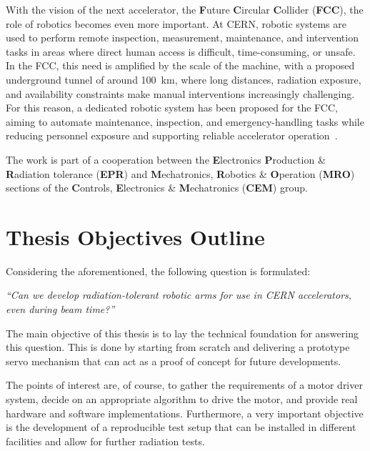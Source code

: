With the vision of the next accelerator, the \textbf{F}uture \textbf{C}ircular \textbf{C}ollider (\textbf{FCC}), the role of robotics becomes even more important. At CERN, robotic systems are used to perform remote inspection, measurement, maintenance, and intervention tasks in areas where direct human access is difficult, time-consuming, or unsafe. In the FCC, this need is amplified by the scale of the machine, with a proposed underground tunnel of around \SI{100}{\kilo\metre}, where long distances, radiation exposure, and availability constraints make manual interventions increasingly challenging. For this reason, a dedicated robotic system has been proposed for the FCC, aiming to automate maintenance, inspection, and emergency-handling tasks while reducing personnel exposure and supporting reliable accelerator operation~\cite{Gamper2024Robotic}.

The work is part of a cooperation between the \textbf{E}lectronics \textbf{P}roduction \& \textbf{R}adiation tolerance (\textbf{EPR}) and \textbf{M}echatronics, \textbf{R}obotics \& \textbf{O}peration (\textbf{MRO}) sections of the \textbf{C}ontrols, \textbf{E}lectronics \& \textbf{M}echatronics (\textbf{CEM}) group.

\section{Thesis Objectives Outline}
\label{section:thesis-objectives}

Considering the aforementioned, the following question is formulated:

\vspace{1em}

\begin{center}
    \begin{minipage}{0.65\textwidth}
        \centering
        \itshape
        \normalsize
        ``Can we develop radiation-tolerant robotic arms for use in CERN accelerators, even during beam time?''
    \end{minipage}
\end{center}

\vspace{1em}

The main objective of this thesis is to lay the technical foundation for answering this question. This is done by starting from scratch and delivering a prototype servo mechanism that can act as a proof of concept for future developments.

The points of interest are, of course, to gather the requirements of a motor driver system, decide on an appropriate algorithm to drive the motor, and provide real hardware and software implementations. Furthermore, a very important objective is the development of a reproducible test setup that can be installed in different facilities and allow for further radiation tests.

